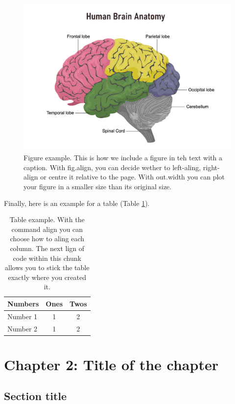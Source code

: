 \documentclass[
]{article}
\begin{document}
\begin{figure}

{\centering \includegraphics[width=0.7\linewidth]{Figures/Example1} 

}

\caption{Figure example. This is how we include a figure in teh text with a caption. With fig.align, you can decide wether to left-aling, right-align or centre it relative to the page. With out.width you can plot your figure in a smaller size than its original size.}\label{fig:examplefig1}
\end{figure}

Finally, here is an example for a table (Table \ref{tab:exampletable1}).

\begin{table}[H]

\caption{\label{tab:exampletable1}Table example. With the command align you can choose how to aling each column. The next lign of code within this chunk allows you to stick the table exactly where you created it.}
\centering
\begin{tabular}[t]{l|c|c}
\hline
Numbers & Ones & Twos\\
\hline
Number 1 & 1 & 2\\
\hline
Number 2 & 1 & 2\\
\hline
\end{tabular}
\end{table}

\pagebreak

\hypertarget{chapter-2-title-of-the-chapter}{%
\section{Chapter 2: Title of the chapter}\label{chapter-2-title-of-the-chapter}}

\hypertarget{section-title-1}{%
\subsection{Section title}\label{section-title-1}}
\end{document}
